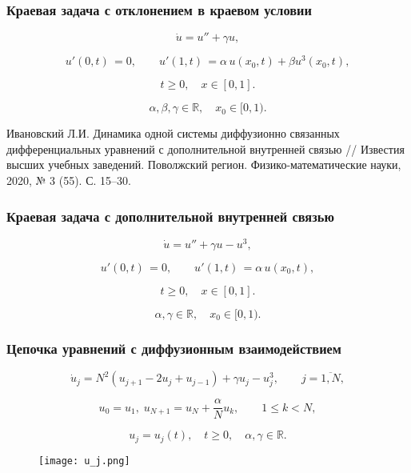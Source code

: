 \documentclass[fullscreen=true, unicode, bookmarks=false]{beamer}
\begin{document}
\begin{frame}
\frametitle{ Краевая задача с отклонением в краевом условии }
 
\begin{equation}
	\dot u = u'' + \gamma u,	
\end{equation}

\begin{equation}
	u'(0, t) \, = 0, \qquad u'(1, t) \, = \alpha\,u(x_0, t) + \beta u^3(x_0, t),
\end{equation}

\bigskip

$$ t \geqslant 0, \quad x \in [0,1]. $$

$$ \alpha, \beta, \gamma \in \mathbb{R}, \quad x_0 \in [0, 1). $$

\bigskip

\begin{exampleblock}{}
Ивановский Л.И. Динамика одной системы диффузионно связанных дифференциальных уравнений с дополнительной внутренней связью // Известия высших учебных заведений. Поволжский регион. Физико-математические науки, 2020, № 3 (55). С. 15–30.
\end{exampleblock}

\end{frame}

\begin{frame}
\frametitle{ Краевая задача с дополнительной внутренней связью }
 
\begin{equation}
	\dot u = u'' + \gamma u - u^3,	
\end{equation}

\begin{equation}
	u'(0, t) \, = 0, \qquad u'(1, t) \, = \alpha\,u(x_0, t),
\end{equation}

\bigskip

$$ t \geqslant 0, \quad x \in [0,1]. $$

$$ \alpha, \gamma \in \mathbb{R}, \quad x_0 \in [0, 1). $$

\end{frame}

\begin{frame}
\frametitle{ Цепочка уравнений с диффузионным взаимодействием }
 
\begin{equation}
	\dot u_j = N^2(u_{j+1} - 2u_j + u_{j-1}) + \gamma u_j - u_j^3, \qquad j = \overline{1, N},
\end{equation}

\begin{equation}
	u_0 = u_1, \; u_{N+1} = u_N + \dfrac{\alpha}{N}u_k, \qquad 1 \leqslant k < N,
\end{equation}

\bigskip

$$ u_j = u_j(t), \quad t \geqslant 0, \quad \alpha, \gamma \in \mathbb{R}. $$

\bigskip

\begin{figure} 
\texttt{[image: u\_j.png]}  
\end{figure}

\end{frame}
\end{document}
